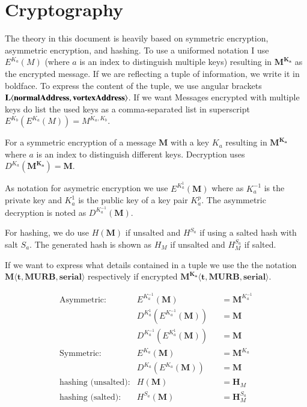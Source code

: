 \section{Cryptography \label{sec:encNot}}
The theory in this document is heavily based on symmetric encryption, asymmetric encryption, and hashing. To use a uniformed notation I use $E^{K_a}(M)$ (where $a$ is an index to distinguish multiple keys) resulting in $\mathbf{M^{K_a}}$ as the encrypted message. If we are reflecting a tuple of information, we write it in boldface. To express the content of the tuple, we use angular brackets $\splitatcommas{\mathbf{L\langle normalAddress,vortexAddress\rangle }}$. If we want Messages encrypted with multiple keys do list the used keys as a comma-separated list in superscript $E^{K_b}\left(E^{K_a}\left(M\right)\right)=M^{{K_{a}},{K_b}}$.

For a symmetric encryption of a message $\mathbf{M}$ with a key $K_a$ resulting in $\mathbf{M^{K_a}}$ where $a$ is an index to distinguish different keys. Decryption uses $D^{K_a}(\mathbf{M^{K_a}})=\mathbf{M}$.

As notation for asymetric encryption we use $E^{K^{1}_a}(\mathbf{M})$ where as $K^{-1}_a$ is the private key and $K^{1}_a$ is the public key of a key pair $K^p_a$. The asymmetric decryption is noted as $D^{K^{-1}_a}(\mathbf{M})$.

For hashing, we do use $H(\mathbf{M})$ if unsalted and $H^{S_a}$ if using a salted hash with salt $S_a$. The generated hash is shown as $H_M$ if unsalted and $H^{S_a}_M$ if salted.

If we want to express what details contained in a tuple we use the the notation $\mathbf{M\langle t,MURB,serial\rangle }$ respectively if encrypted $\mathbf{M^{K_{a}}\langle t,MURB,serial\rangle}$.

\begin{align*}
	\text{Asymmetric:}         & E^{K^{-1}_a}\left(\mathbf{M}\right)                            && =\mathbf{M}^{K^{-1}_a}\\
	& D^{K^{1}_a}\left(E^{K^{-1}_a}\left(\mathbf{M}\right)\right)    && =\mathbf{M}\\
	& D^{K^{-1}_a}\left(E^{K^{1}_a}\left(\mathbf{M}\right)\right)    && =\mathbf{M}\\
	\text{Symmetric:}          & E^{K_a}\left(\mathbf{M}\right)                                 && =\mathbf{M}^{K_a}\\
	& D^{K_a}\left(E^{K_a}\left(\mathbf{M}\right)\right)          && =\mathbf{M}\\
	\text{hashing (unsalted):}& H\left(\mathbf{M}\right)                                       && =\mathbf{H}_M\\
	\text{hashing (salted):}  & H^{S_a}\left(\mathbf{M}\right)                                 && =\mathbf{H}^{S_a}_M
\end{align*}

